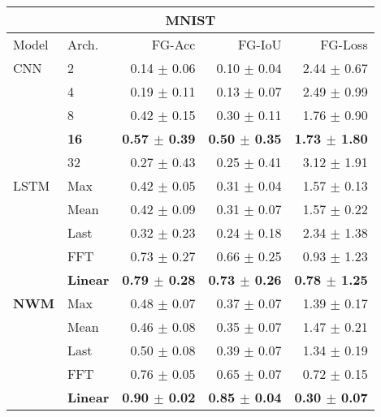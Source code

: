 \begin{table*}[t]
    \centering
    \begin{minipage}{0.48\linewidth}
        \centering
        \begin{tabular}{llrrr}
        \toprule
        \multicolumn{5}{c}{\textbf{MNIST}} \\
        \midrule
        Model & Arch. & FG-Acc & FG-IoU & FG-Loss \\
        \midrule
        CNN & 2              & 0.14 $\pm$ 0.06 & 0.10 $\pm$ 0.04 & 2.44 $\pm$ 0.67 \\
            & 4              & 0.19 $\pm$ 0.11 & 0.13 $\pm$ 0.07 & 2.49 $\pm$ 0.99 \\
            & 8              & 0.42 $\pm$ 0.15 & 0.30 $\pm$ 0.11 & 1.76 $\pm$ 0.90 \\
            & \textbf{16}    & \textbf{0.57 $\pm$ 0.39} & \textbf{0.50 $\pm$ 0.35} & \textbf{1.73 $\pm$ 1.80} \\
            & 32             & 0.27 $\pm$ 0.43 & 0.25 $\pm$ 0.41 & 3.12 $\pm$ 1.91 \\
        \cline{1-5}
        LSTM & Max           & 0.42 $\pm$ 0.05 & 0.31 $\pm$ 0.04 & 1.57 $\pm$ 0.13 \\
             & Mean          & 0.42 $\pm$ 0.09 & 0.31 $\pm$ 0.07 & 1.57 $\pm$ 0.22 \\
             & Last          & 0.32 $\pm$ 0.23 & 0.24 $\pm$ 0.18 & 2.34 $\pm$ 1.38 \\
             & FFT           & 0.73 $\pm$ 0.27 & 0.66 $\pm$ 0.25 & 0.93 $\pm$ 1.23 \\
             & \textbf{Linear} & \textbf{0.79 $\pm$ 0.28} & \textbf{0.73 $\pm$ 0.26} & \textbf{0.78 $\pm$ 1.25} \\
        \cline{1-5}
        \textbf{NWM} & Max & 0.48 $\pm$ 0.07 & 0.37 $\pm$ 0.07 & 1.39 $\pm$ 0.17 \\
                       & Mean & 0.46 $\pm$ 0.08 & 0.35 $\pm$ 0.07 & 1.47 $\pm$ 0.21 \\
                       & Last & 0.50 $\pm$ 0.08 & 0.39 $\pm$ 0.07 & 1.34 $\pm$ 0.19 \\
                       & FFT  & 0.76 $\pm$ 0.05 & 0.65 $\pm$ 0.07 & 0.72 $\pm$ 0.15 \\
                       & \textbf{Linear} & \textbf{0.90 $\pm$ 0.02} & \textbf{0.85 $\pm$ 0.04} & \textbf{0.30 $\pm$ 0.07} \\

\end{tabular}
\end{minipage}
\end{table*}
